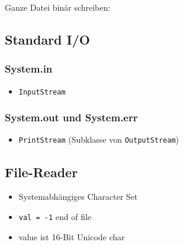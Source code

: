 \vspace{3mm}
\begin{minipage}[t]{0.48\columnwidth}
    Ganze Datei binär schreiben:
    
\end{minipage}

\subsection{Standard I/O}
\vspace{-0.7\abovedisplayskip}
\begin{minipage}[t]{0.4\columnwidth}
    \subsubsection{\textsf{System.in}}
    \begin{itemize}
        \item \lstinline{InputStream}
    \end{itemize}
\end{minipage}\hfill%
\begin{minipage}[t]{0.59\columnwidth}
    \subsubsection{\textsf{System.out} und \textsf{System.err}}
    \begin{itemize}
        \item \lstinline{PrintStream} (Subklasse von \lstinline{OutputStream})
    \end{itemize}
\end{minipage}

\subsection{File-Reader}
\begin{minipage}[t]{0.55\columnwidth}
    \vspace{-0.8\abovedisplayskip}
    
\end{minipage}
\begin{minipage}[t]{0.44\columnwidth}
    \raggedright%
    \begin{itemize}
        \item Systemabhängiges Character Set
        \item \lstinline{val = -1} \textrightarrow{} end of file
        \item value ist 16-Bit Unicode char
    \end{itemize}
\end{minipage}
